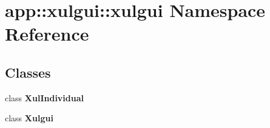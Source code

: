 \section{app::xulgui::xulgui Namespace Reference}
\label{namespaceapp_1_1xulgui_1_1xulgui}


\subsection*{Classes}
\begin{CompactItemize}
\item 
class {\bf XulIndividual}
\item 
class {\bf Xulgui}
\end{CompactItemize}
